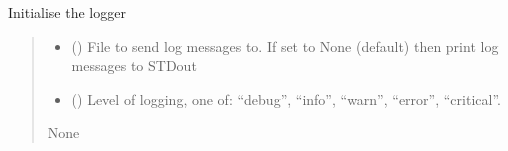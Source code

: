 \documentclass[letterpaper,10pt,english]{sphinxmanual}
\begin{document}
\begin{fulllineitems}
\label{\detokenize{misc:glomar_gridding.utils.init_logging}}
\pysigstartsignatures
\pysiglinewithargsret
{}
{\sphinxparamcomma {}}
{}
\pysigstopsignatures
\sphinxAtStartPar
Initialise the logger
\begin{quote}\begin{description}
\begin{itemize}
\item {}
\sphinxAtStartPar
{} () \textendash{} File to send log messages to. If set to None (default) then print log
messages to STDout

\item {}
\sphinxAtStartPar
{} () \textendash{} Level of logging, one of: “debug”, “info”, “warn”, “error”, “critical”.

\end{itemize}

\sphinxAtStartPar
None

\end{description}\end{quote}

\end{fulllineitems}

\end{document}
